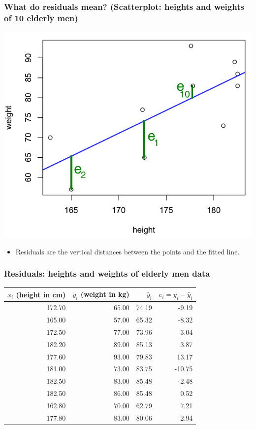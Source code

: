 \documentclass[handout]{beamer}\usepackage{graphicx, color}
\providecommand{\wh}[1]{\widehat{#1}}
\numberwithin{equation}{section}
\begin{document}
\begin{frame}
\frametitle{\small What do residuals mean? (Scatterplot: heights and weights of 10 elderly men)}
\begin{center}
 \includegraphics{../../fig/residmeaning}
\end{center}
\begin{itemize}
\item Residuals are the vertical distances between the points and the fitted line.
\end{itemize}
\end{frame}

\begin{frame}[fragile]
\frametitle{Residuals: heights and weights of elderly men data}
\begin{table}[ht]
\centering
\begin{tabular}{rrrr}
 $x_i$ (height in cm) & $y_i$ (weight in kg) & $\wh{y}_i$ & $e_i = y_i - \wh{y}_i$ \\ 
  \hline
172.70 & 65.00 & 74.19 & -9.19 \\ 
  165.00 & 57.00 & 65.32 & -8.32 \\ 
  172.50 & 77.00 & 73.96 & 3.04 \\ 
  182.20 & 89.00 & 85.13 & 3.87 \\ 
  177.60 & 93.00 & 79.83 & 13.17 \\ 
  181.00 & 73.00 & 83.75 & -10.75 \\ 
  182.50 & 83.00 & 85.48 & -2.48 \\ 
  182.50 & 86.00 & 85.48 & 0.52 \\ 
  162.80 & 70.00 & 62.79 & 7.21 \\ 
  177.80 & 83.00 & 80.06 & 2.94 \\ 
  \end{tabular}
\end{table}


\end{frame}
\end{document}
